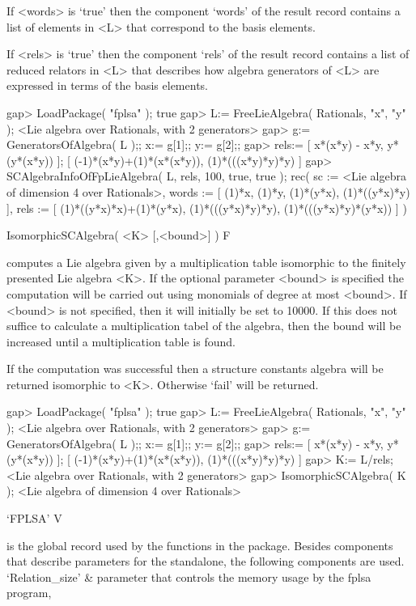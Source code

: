 If <words> is `true' then the component `words' of the result record
contains a list of elements in <L> that correspond to the basis elements.

If <rels> is `true' then the component `rels' of the result record
contains a list of reduced relators in <L> that describes how algebra
generators of <L> are expressed in terms of the basis elements.

\beginexample
gap> LoadPackage( "fplsa" );
true
gap> L:= FreeLieAlgebra( Rationals, "x", "y" );
<Lie algebra over Rationals, with 2 generators>
gap> g:= GeneratorsOfAlgebra( L );; x:= g[1];; y:= g[2];;
gap> rels:= [ x*(x*y) - x*y, y*(y*(x*y)) ];
[ (-1)*(x*y)+(1)*(x*(x*y)), (1)*(((x*y)*y)*y) ]
gap> SCAlgebraInfoOfFpLieAlgebra( L, rels, 100, true, true );
rec( sc := <Lie algebra of dimension 4 over Rationals>, 
  words := [ (1)*x, (1)*y, (1)*(y*x), (1)*((y*x)*y) ], 
  rels := [ (1)*((y*x)*x)+(1)*(y*x), (1)*(((y*x)*y)*y), (1)*(((y*x)*y)*(y*x)) 
     ] )
\endexample

\> IsomorphicSCAlgebra( <K> [,<bound>] )         F

computes a Lie algebra given by a multiplication table isomorphic to the 
finitely presented Lie algebra <K>.
If the optional parameter <bound> is specified the computation will
be carried out using monomials of degree at most <bound>. 
If <bound> is not specified, then it will initially be set to
10000. If this does not suffice to calculate a multiplication tabel
of the algebra, then the bound will be increased until a multiplication
table is found.
  
If the computation was successful then a structure constants algebra
will be returned isomorphic to <K>.
Otherwise `fail' will be returned.

\beginexample
gap> LoadPackage( "fplsa" );
true
gap> L:= FreeLieAlgebra( Rationals, "x", "y" );
<Lie algebra over Rationals, with 2 generators>
gap> g:= GeneratorsOfAlgebra( L );; x:= g[1];; y:= g[2];;
gap> rels:= [ x*(x*y) - x*y, y*(y*(x*y)) ];
[ (-1)*(x*y)+(1)*(x*(x*y)), (1)*(((x*y)*y)*y) ]
gap> K:= L/rels;
<Lie algebra over Rationals, with 2 generators>
gap> IsomorphicSCAlgebra( K );
<Lie algebra of dimension 4 over Rationals>
\endexample



\>`FPLSA' V

is the global record used by the functions in the package.
Besides components that describe parameters for the standalone,
the following components are used.
\beginitems
`Relation_size' & 
       parameter that controls the memory usage by the fplsa program,

